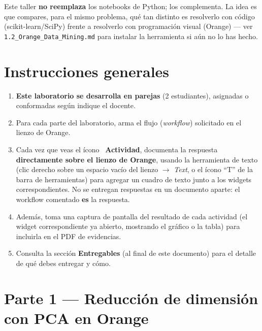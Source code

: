 \documentclass[11pt,letterpaper]{article}
\newcommand{\faPencil}{\raisebox{-0.1em}{\textbf{\Large\textbullet}}}
\begin{document}
\begin{nota}
Este taller \textbf{no reemplaza} los notebooks de Python; los complementa. La idea es que compares, para el mismo problema, qué tan distinto es resolverlo con código (scikit-learn/SciPy) frente a resolverlo con programación visual (Orange) --- ver \texttt{1.2\_Orange\_Data\_Mining.md} para instalar la herramienta si aún no lo has hecho.
\end{nota}

\section{Instrucciones generales}

\begin{enumerate}[leftmargin=1.2cm]
  \item \textbf{Este laboratorio se desarrolla en parejas} (2 estudiantes), asignadas o conformadas según indique el docente.
  \item Para cada parte del laboratorio, arma el flujo (\textit{workflow}) solicitado en el lienzo de Orange.
  \item Cada vez que veas el ícono \faPencil\ \textbf{Actividad}, documenta la respuesta \textbf{directamente sobre el lienzo de Orange}, usando la herramienta de texto (clic derecho sobre un espacio vacío del lienzo $\to$ \textit{Text}, o el ícono ``T'' de la barra de herramientas) para agregar un cuadro de texto junto a los widgets correspondientes. No se entregan respuestas en un documento aparte: el workflow comentado \textbf{es} la respuesta.
  \item Además, toma una captura de pantalla del resultado de cada actividad (el widget correspondiente ya abierto, mostrando el gráfico o la tabla) para incluirla en el PDF de evidencias.
  \item Consulta la sección \textbf{Entregables} (al final de este documento) para el detalle de qué debes entregar y cómo.
\end{enumerate}

\section{Parte 1 --- Reducción de dimensión con PCA en Orange}
\end{document}
